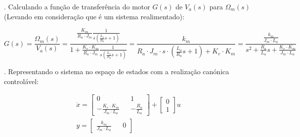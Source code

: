 \documentclass[10pt]{article}
\begin{document}
. Calculando a função de transferência do motor $G(s)$ de $V_a(s)$ para $\Omega_m(s)$
(Levando em consideração que é um sistema realimentado):

\begin{equation}
    G(s) = \frac{\Omega_m(s)}{V_a(s)}
    = \frac{\frac{K_m}{R_a \cdot J_m}\frac{1}{s (\frac{L_a}{R_a}s + 1)}}{1 + \frac{K_e \cdot K_m}{R_a \cdot J_m}\frac{1}{s (\frac{L_a}{R_a}s + 1)}}
    = \frac{k_m}{R_a \cdot J_m \cdot s \cdot (\frac{L_a}{R_a}s + 1) + K_e \cdot K_m}
    = \frac{\frac{k_m}{J_m \cdot L_a}}{s^2 + \frac{R_a}{L_a}s + \frac{K_e \cdot K_m}{J_m \cdot L_a}}
\end{equation}

. Representando o sistema no espaço de estados com a realização canónica controlável:

\begin{equation}
\begin{aligned}
    \dot{x} =
    \begin{bmatrix}
        0 && 1 \\
        -\frac{K_e \cdot K_m}{J_m \cdot L_a} && -\frac{R_a}{L_a}
    \end{bmatrix}
    +
    \begin{bmatrix}
        0 \\
        1
    \end{bmatrix}
    u \\
    y =
    \begin{bmatrix}
        \frac{k_m}{J_m \cdot L_a} && 0
    \end{bmatrix}
\end{aligned}
\end{equation}
\end{document}
